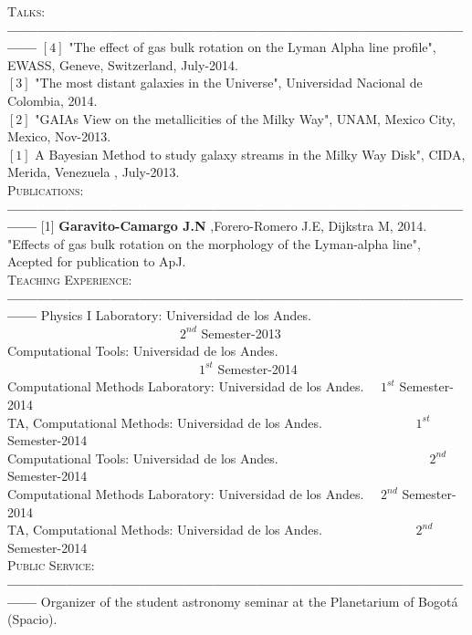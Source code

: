 \documentclass[letterpaper]{article}
\begin{document}
\textsc{\Large Talks:}\\
{\bf---------------------------------------------------------------------------------------------------}
$\left[4\right]$ "The effect of gas bulk rotation on the Lyman Alpha line profile", EWASS, Geneve, Switzerland, July-2014.\\
$\left[3\right]$  "The most distant galaxies in the Universe", Universidad Nacional de Colombia, 2014.\\
$\left[2\right]$ "GAIAs View on the metallicities of the Milky Way", UNAM, Mexico City, Mexico, Nov-2013. \\
$\left[1\right]$  A Bayesian Method to study galaxy streams in the Milky Way Disk", CIDA, Merida, Venezuela , July-2013.\\

\textsc{\Large Publications:}\\
{\bf---------------------------------------------------------------------------------------------------}
[1] {\bf Garavito-Camargo J.N} ,Forero-Romero J.E, Dijkstra M, 2014. "Effects of gas bulk rotation on the morphology of the Lyman-alpha line", Acepted for publication to ApJ.\\

\textsc{\Large Teaching Experience:}\\
{\bf---------------------------------------------------------------------------------------------------}
Physics I Laboratory: Universidad de los Andes. \indent \ \ \ \ \ \ \ \ \ \ \ \ \ \ \ \ \ \ \ \ \ \ \ \ \ \ \ $2^{nd}$ Semester-2013\\
Computational Tools: Universidad de los Andes. \indent \ \ \ \ \ \ \ \ \ \ \ \ \ \ \ \ \ \ \ \ \ \ \ \ \ \ \ \ \ \ $1^{st}$ Semester-2014\\
Computational Methods Laboratory: Universidad de los Andes. \indent  \ \ $1^{st}$ Semester-2014\\
TA, Computational Methods: Universidad de los Andes. \indent \ \ \ \ \ \ \ \ \ \ \ \ \ \   $1^{st}$ Semester-2014\\
Computational Tools: Universidad de los Andes. \indent \ \ \ \ \ \ \ \ \ \ \ \ \ \ \ \ \ \ \ \ \ \ \ $2^{nd}$ Semester-2014\\
Computational Methods Laboratory: Universidad de los Andes. \indent  \ \ $2^{nd}$ Semester-2014\\
TA, Computational Methods: Universidad de los Andes. \indent \ \ \ \ \ \ \ \ \ \ \ \ \ \   $2^{nd}$ Semester-2014\\

\textsc{\Large Public Service:}\\
{\bf---------------------------------------------------------------------------------------------------}
Organizer of the student astronomy seminar at the Planetarium of Bogot\'a (Spacio).
\end{document}

